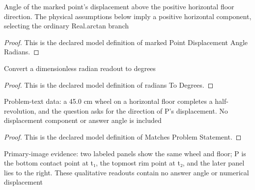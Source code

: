 \begin{definition}
  \label{def:physics:phyx-mini-0736:phyxminiproblems-problemphyxmini0736-markedpointdisplacementangleradians}
  Angle of the marked point's displacement above the positive horizontal floor direction. The physical assumptions below imply a positive horizontal component, selecting the ordinary Real.arctan branch
\end{definition}
\begin{proof}
  This is the declared model definition of marked Point Displacement Angle Radians.
\end{proof}
\begin{definition}
  \label{def:physics:phyx-mini-0736:phyxminiproblems-problemphyxmini0736-radianstodegrees}
  Convert a dimensionless radian readout to degrees
\end{definition}
\begin{proof}
  This is the declared model definition of radians To Degrees.
\end{proof}
\begin{definition}
  \label{def:physics:phyx-mini-0736:phyxminiproblems-problemphyxmini0736-matchesproblemstatement}
  Problem-text data: a 45.0 cm wheel on a horizontal floor completes a half-revolution, and the question asks for the direction of P's displacement. No displacement component or answer angle is included
\end{definition}
\begin{proof}
  This is the declared model definition of Matches Problem Statement.
\end{proof}
\begin{definition}
  \label{def:physics:phyx-mini-0736:phyxminiproblems-problemphyxmini0736-matchesprimaryfigure}
  Primary-image evidence: two labeled panels show the same wheel and floor; P is the bottom contact point at t₁, the topmost rim point at t₂, and the later panel lies to the right. These qualitative readouts contain no answer angle or numerical displacement
\end{definition}
